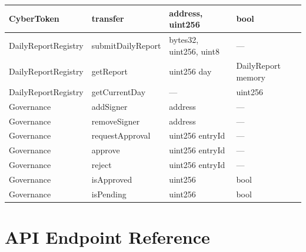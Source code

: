 \documentclass[12pt,a4paper]{article}
\begin{document}
\begin{longtable}{@{}llp{5cm}p{3cm}@{}}
CyberToken & transfer & address, uint256 & bool \\
\midrule
DailyReportRegistry & submitDailyReport & bytes32, uint256, uint8 & --- \\
DailyReportRegistry & getReport & uint256 day & DailyReport memory \\
DailyReportRegistry & getCurrentDay & --- & uint256 \\
\midrule
Governance & addSigner & address & --- \\
Governance & removeSigner & address & --- \\
Governance & requestApproval & uint256 entryId & --- \\
Governance & approve & uint256 entryId & --- \\
Governance & reject & uint256 entryId & --- \\
Governance & isApproved & uint256 & bool \\
Governance & isPending & uint256 & bool \\
\bottomrule
\end{longtable}

\section{API Endpoint Reference}
\label{app:api}
\end{document}
